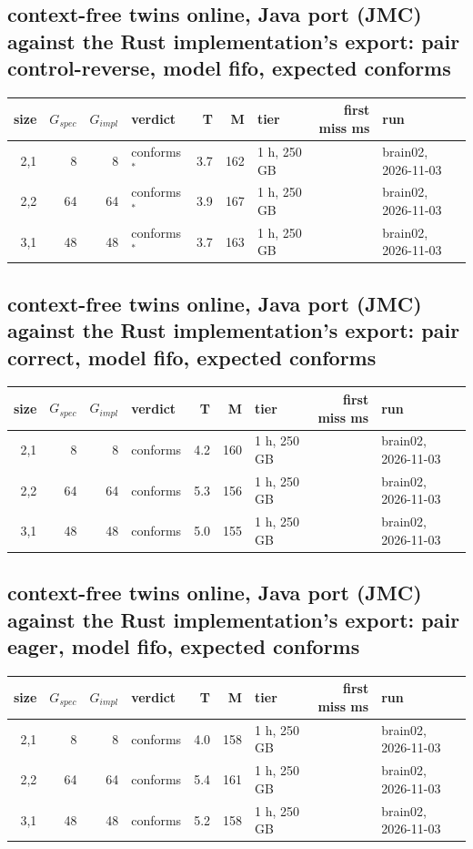 \documentclass[10pt]{article}
\begin{document}
\subsection*{context-free twins online, Java port (JMC) against the Rust implementation's export: pair \textsf{control-reverse}, model fifo, expected conforms}
\begin{longtable}{@{}rrrlrrlrl@{}}
\toprule
size & $G_{\mathit{spec}}$ & $G_{\mathit{impl}}$ & verdict & T & M & tier & first miss ms & run \\
\midrule
\endhead
\color{red} 2,1 & 8 & 8 & conforms$^{\ast}$ & 3.7 & 162 & 1 h, 250 GB &  & brain02, 2026-11-03 \\
\color{red} 2,2 & 64 & 64 & conforms$^{\ast}$ & 3.9 & 167 & 1 h, 250 GB &  & brain02, 2026-11-03 \\
\color{red} 3,1 & 48 & 48 & conforms$^{\ast}$ & 3.7 & 163 & 1 h, 250 GB &  & brain02, 2026-11-03 \\
\bottomrule
\end{longtable}
\subsection*{context-free twins online, Java port (JMC) against the Rust implementation's export: pair \textsf{correct}, model fifo, expected conforms}
\begin{longtable}{@{}rrrlrrlrl@{}}
\toprule
size & $G_{\mathit{spec}}$ & $G_{\mathit{impl}}$ & verdict & T & M & tier & first miss ms & run \\
\midrule
\endhead
\color{red} 2,1 & 8 & 8 & conforms & 4.2 & 160 & 1 h, 250 GB &  & brain02, 2026-11-03 \\
\color{blue} 2,2 & 64 & 64 & conforms & 5.3 & 156 & 1 h, 250 GB &  & brain02, 2026-11-03 \\
\color{blue} 3,1 & 48 & 48 & conforms & 5.0 & 155 & 1 h, 250 GB &  & brain02, 2026-11-03 \\
\bottomrule
\end{longtable}
\subsection*{context-free twins online, Java port (JMC) against the Rust implementation's export: pair \textsf{eager}, model fifo, expected conforms}
\begin{longtable}{@{}rrrlrrlrl@{}}
\toprule
size & $G_{\mathit{spec}}$ & $G_{\mathit{impl}}$ & verdict & T & M & tier & first miss ms & run \\
\midrule
\endhead
\color{red} 2,1 & 8 & 8 & conforms & 4.0 & 158 & 1 h, 250 GB &  & brain02, 2026-11-03 \\
\color{blue} 2,2 & 64 & 64 & conforms & 5.4 & 161 & 1 h, 250 GB &  & brain02, 2026-11-03 \\
\color{blue} 3,1 & 48 & 48 & conforms & 5.2 & 158 & 1 h, 250 GB &  & brain02, 2026-11-03 \\
\bottomrule
\end{longtable}
\end{document}

